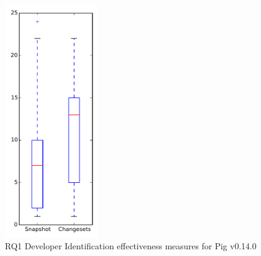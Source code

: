 
\begin{figure}[t]
\centering
\includegraphics[width=0.36\textwidth]{figures/dit/rq1_pig}
\caption{RQ1 Developer Identification effectiveness measures for Pig v0.14.0}
\label{fig:dit:rq1:pig}
\end{figure}
